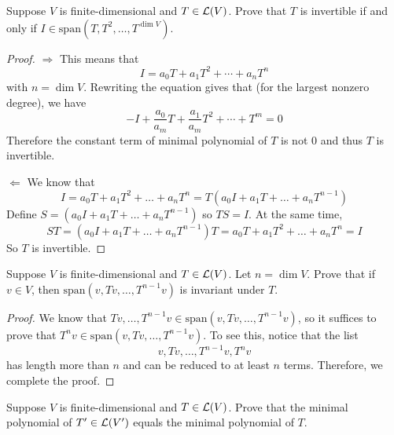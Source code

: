 \documentclass{extarticle}
\begin{document}
\begin{problem}{22}
    Suppose \(V\) is finite-dimensional and \(T \in \mathcal{L}(V)\). Prove that \(T\) is invertible if and only 
    if \(I \in \text{span}(T, T^2, \ldots, T^{\dim V})\). 
\end{problem}

\begin{proof}
\(\Rightarrow\) This means that 
\[I = a_0 T + a_1 T^2 + \cdots + a_n T^n\]
with \(n = \dim V\). Rewriting the equation gives that (for the largest nonzero degree), we have 
\[-I + \frac{a_0}{a_m}T + \frac{a_1}{a_m}T^2 + \cdots + T^m = 0\]
Therefore the constant term of minimal polynomial of \(T\) is not 0 and thus \(T\) is invertible. 


\(\Leftarrow\) We know that 
\[I = a_0 T + a_1 T^2 + \ldots + a_n T^n = T(a_0 I + a_1 T + \ldots + a_nT^{n-1})\]
Define \(S = (a_0 I + a_1 T + \ldots + a_nT^{n-1})\) so \(TS = I\). At the same time,
\[ST = (a_0 I + a_1 T + \ldots + a_n T^{n-1})T = a_0 T + a_1 T^2 + \ldots + a_n T^n 
= I\]
So \(T\) is invertible. 
\end{proof}

\begin{problem}{23}
    Suppose \(V\) is finite-dimensional and \(T \in \mathcal{L}(V)\). Let \(n = \dim V\). Prove that 
    if \(v \in V\), then \(\text{span}(v, Tv, \ldots, T^{n-1}v)\) is invariant under \(T\).
\end{problem}

\begin{proof}
We know that \(Tv, \ldots, T^{n-1}v \in \text{span}(v, Tv, \ldots, T^{n-1}v)\), so it suffices 
to prove that \(T^n v \in \text{span}(v, Tv, \ldots, T^{n-1}v)\). To see this, notice that the list 
\[v, Tv, \ldots, T^{n-1}v, T^n v\]
has length more than \(n\) and can be reduced to at least \(n\) terms. Therefore, we complete the proof.
\end{proof}

\begin{problem}{28}
    Suppose \(V\) is finite-dimensional and \(T \in \mathcal{L}(V)\). Prove that the minimal polynomial of 
    \(T' \in \mathcal{L}(V')\) equals the minimal polynomial of \(T\).
\end{problem}
\end{document}
